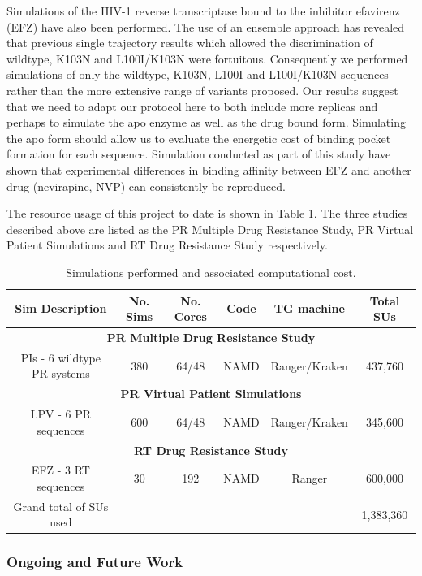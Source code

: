 \documentclass[a4paper,10pt]{article}
\begin{document}
Simulations of the HIV-1 reverse transcriptase bound to the inhibitor efavirenz (EFZ) have also 
been performed. The use of an ensemble approach has revealed that previous single trajectory results 
which allowed the discrimination of wildtype, K103N and L100I/K103N were fortuitous. Consequently we 
performed simulations of only the wildtype, K103N, L100I and L100I/K103N sequences rather than the 
more extensive range of variants proposed. Our results suggest that we need to adapt our protocol here 
to both include more replicas and perhaps to simulate the apo enzyme as well as the drug bound form. 
Simulating the apo form should allow us to evaluate the energetic cost of binding pocket formation 
for each sequence. Simulation conducted as part of this study have shown that experimental differences 
in binding affinity between EFZ and another drug (nevirapine, NVP) can consistently be reproduced.

The resource usage of this project to date is shown in Table \ref{t:hiv_used}. The three studies 
described above are listed as the PR Multiple Drug Resistance Study, PR Virtual Patient Simulations 
and RT Drug Resistance Study respectively.

\begin{table}[h]
\scriptsize
\centering
\begin{tabular}[b]
{|c|c|c|c|c|c|}
\hline
\textbf{Sim Description} & \textbf{No. Sims} &
\textbf{No. Cores} & \textbf{Code} & \textbf{TG machine} & \textbf{Total SUs}\\
\hline
\multicolumn{6}{|c|}{\textbf{PR Multiple Drug Resistance Study}}\\
\hline
PIs - 6 wildtype PR systems & 380 & 64/48 & NAMD & Ranger/Kraken & 437,760 \\
\hline
\multicolumn{6}{|c|}{\textbf{PR Virtual Patient Simulations}}\\
\hline
LPV - 6 PR sequences & 600 & 64/48 & NAMD & Ranger/Kraken & 345,600 \\
\hline
\multicolumn{6}{|c|}{\textbf{RT Drug Resistance Study}}\\
\hline
EFZ - 3 RT sequences & 30 & 192 & NAMD & Ranger & 600,000\\
\hline
Grand total of SUs used & & & & & 1,383,360 \\
\hline
\end{tabular} \caption{Simulations performed and associated computational cost.}
\label{t:hiv_used}
\end{table}

\subsubsection{Ongoing and Future Work}\label{se:hiv_future}
\end{document}
